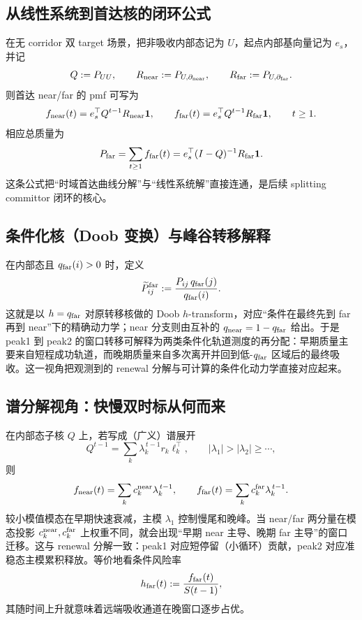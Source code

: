 \documentclass[11pt,fontset=fandol]{ctexart}
\begin{document}
\subsection*{从线性系统到首达核的闭环公式}
在无 corridor 双 target 场景，把非吸收内部态记为 $U$，起点内部基向量记为 $e_s$，并记
\[
Q:=P_{UU},\qquad R_{\rm near}:=P_{U,\partial_{\rm near}},\qquad R_{\rm far}:=P_{U,\partial_{\rm far}}.
\]
则首达 near/far 的 pmf 可写为
\[
f_{\rm near}(t)=e_s^\top Q^{t-1}R_{\rm near}\mathbf 1,\qquad
f_{\rm far}(t)=e_s^\top Q^{t-1}R_{\rm far}\mathbf 1,\qquad t\ge 1.
\]
相应总质量为
\[
P_{\rm far}=\sum_{t\ge 1}f_{\rm far}(t)=e_s^\top(I-Q)^{-1}R_{\rm far}\mathbf 1.
\]
这条公式把“时域首达曲线分解”与“线性系统解”直接连通，是后续 splitting committor 闭环的核心。

\subsection*{条件化核（Doob 变换）与峰谷转移解释}
在内部态且 $q_{\rm far}(i)>0$ 时，定义
\[
\widetilde P^{\rm far}_{ij}:=\frac{P_{ij}\,q_{\rm far}(j)}{q_{\rm far}(i)}.
\]
这就是以 $h=q_{\rm far}$ 对原转移核做的 Doob $h$-transform，对应“条件在最终先到 far 再到 near”下的精确动力学；near 分支则由互补的 $q_{\rm near}=1-q_{\rm far}$ 给出。于是 peak1 到 peak2 的窗口转移可解释为两类条件化轨道测度的再分配：早期质量主要来自短程成功轨道，而晚期质量来自多次离开并回到低-$q_{\rm far}$ 区域后的最终吸收。这一视角把观测到的 renewal 分解与可计算的条件化动力学直接对应起来。

\subsection*{谱分解视角：快慢双时标从何而来}
在内部态子核 $Q$ 上，若写成（广义）谱展开
\[
Q^{t-1}=\sum_{k}\lambda_k^{\,t-1} r_k\ell_k^\top,\qquad |\lambda_1|>|\lambda_2|\ge\cdots,
\]
则
\[
f_{\rm near}(t)=\sum_k c_k^{\rm near}\lambda_k^{\,t-1},\qquad
f_{\rm far}(t)=\sum_k c_k^{\rm far}\lambda_k^{\,t-1}.
\]
较小模值模态在早期快速衰减，主模 $\lambda_1$ 控制慢尾和晚峰。当 near/far 两分量在模态投影 $c_k^{\rm near},c_k^{\rm far}$ 上权重不同，就会出现“早期 near 主导、晚期 far 主导”的窗口迁移。这与 renewal 分解一致：peak1 对应短停留（小循环）贡献，peak2 对应准稳态主模累积释放。等价地看条件风险率
\[
h_{\rm far}(t):=\frac{f_{\rm far}(t)}{S(t-1)},
\]
其随时间上升就意味着远端吸收通道在晚窗口逐步占优。
\end{document}
